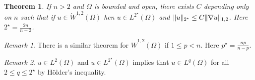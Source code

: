 \documentclass[10pt, oneside, reqno]{amsart}
\theoremstyle{plain}%
\newtheorem{thm}{Theorem}[section]
\numberwithin{equation}{section}
\theoremstyle{definition}
\theoremstyle{remark}
\newtheorem*{rem}{Remark}
\begin{document}
\begin{thm}
    \label{thm:his_thm_7.3}
    If $n > 2$ and $\Omega$ is bounded and open, there exists $C$ depending only on $n$ such that if $u \in \dot W^{1, 2}(\Omega)$ hen $u \in L^{2^\star}(\Omega)$ and $\| u \|_{2^\star} \leq C \| \nabla u \|_{1, 2}$.  Here $2^\star = \frac{2n}{n-2}$.   
\end{thm}

\begin{rem}
    There is a similar theorem for $\dot W^{1, 2}(\Omega)$ if $1 \leq p < n$.  Here $p^\star = \frac{np}{n - p}$.
\end{rem}

\begin{rem}
    $u \in L^2(\Omega)$ and $u \in L^{2^\star}(\Omega)$ implies that $u \in L^{q}(\Omega)$ for all $2 \leq q \leq 2^\star$ by H\"older's inequality.
\end{rem}
\end{document}
